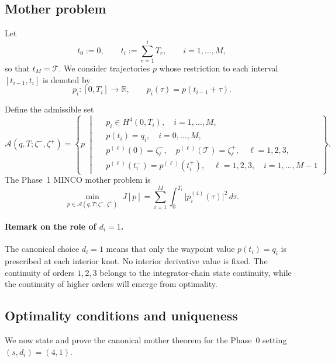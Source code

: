 \subsection{Mother problem}
\label{subsec:phase1_mother_problem}

Let
\[
  t_0:=0,
  \qquad
  t_i:=\sum_{r=1}^{i}T_r,
  \qquad
  i=1,\dots,M,
\]
so that $t_M=\mathcal T$.
We consider trajectories $p$ whose restriction to each interval $[t_{i-1},t_i]$ is denoted by
\[
  p_i:[0,T_i]\to\mathbb R,
  \qquad
  p_i(\tau)=p(t_{i-1}+\tau).
\]

Define the admissible set
\begin{equation}
  \label{eq:phase1_admissible_set}
  \mathcal A(q,T;\zeta^-,\zeta^+)
  =
  \left\{
    p
    \;\middle|\;
    \begin{aligned}
      & p_i\in H^4(0,T_i), \quad i=1,\dots,M,\\
      & p(t_i)=q_i,\quad i=0,\dots,M,\\
      & p^{(\ell)}(0)=\zeta^-_\ell,\quad p^{(\ell)}(\mathcal T)=\zeta^+_\ell,
      \quad \ell=1,2,3,\\
      & p^{(\ell)}(t_i^-)=p^{(\ell)}(t_i^+),\quad \ell=1,2,3,\quad i=1,\dots,M-1
    \end{aligned}
  \right\}.
\end{equation}
The Phase~1 MINCO mother problem is
\begin{equation}
  \label{eq:phase1_mother_problem}
  \boxed{
    \min_{p\in \mathcal A(q,T;\zeta^-,\zeta^+)}
    \;
    J[p]
    =
    \sum_{i=1}^{M}\int_{0}^{T_i}\bigl|p_i^{(4)}(\tau)\bigr|^2\,d\tau.
  }
\end{equation}

\paragraph{Remark on the role of \texorpdfstring{$d_i=1$}{d_i=1}.}
The canonical choice $d_i=1$ means that only the waypoint value $p(t_i)=q_i$ is prescribed at each
interior knot. No interior derivative value is fixed. The continuity of orders $1,2,3$ belongs to the
integrator-chain state continuity, while the continuity of higher orders will emerge from optimality.

\subsection{Optimality conditions and uniqueness}
\label{subsec:phase1_optimality_uniqueness}

We now state and prove the canonical mother theorem for the Phase~0 setting $(s,d_i)=(4,1)$.

